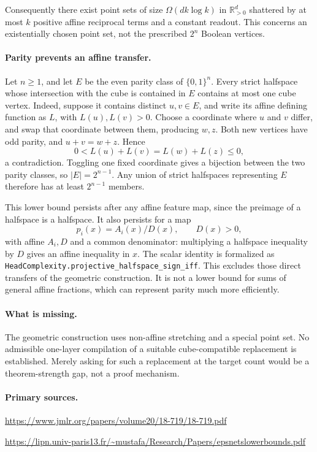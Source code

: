 \documentclass[11pt]{article}
\begin{document}
Consequently there exist point sets of size $\Omega(dk\log k)$ in
$\mathbb R_{>0}^d$ shattered by at most $k$ positive affine reciprocal
terms and a constant readout. This concerns an existentially chosen
point set, not the prescribed $2^n$ Boolean vertices.

\paragraph{Parity prevents an affine transfer.}
Let $n\ge1$, and let $E$ be the even parity class of $\{0,1\}^n$.
Every strict halfspace whose intersection with the cube is contained
in $E$ contains at most one cube vertex. Indeed, suppose it contains
distinct $u,v\in E$, and write its affine defining function as $L$,
with $L(u),L(v)>0$. Choose a coordinate where $u$ and $v$ differ,
and swap that coordinate between them, producing $w,z$.
Both new vertices have odd parity, and $u+v=w+z$. Hence
\[
 0<L(u)+L(v)=L(w)+L(z)\le0,
\]
a contradiction. Toggling one fixed coordinate gives a bijection
between the two parity classes, so $|E|=2^{n-1}$.
Any union of strict halfspaces representing $E$ therefore has at
least $2^{n-1}$ members.

This lower bound persists after any affine feature map, since the
preimage of a halfspace is a halfspace. It also persists for a map
\[
 p_i(x)=A_i(x)/D(x),\qquad D(x)>0,
\]
with affine $A_i,D$ and a common denominator: multiplying a halfspace
inequality by $D$ gives an affine inequality in $x$. The scalar
identity is formalized as
\texttt{HeadComplexity.projective\_halfspace\_sign\_iff}.
This excludes those direct transfers of the geometric construction.
It is not a lower bound for sums of general affine fractions, which
can represent parity much more efficiently.

\paragraph{What is missing.}
The geometric construction uses non-affine stretching and a special
point set. No admissible one-layer compilation of a suitable
cube-compatible replacement is established. Merely asking for such
a replacement at the target count would be a theorem-strength gap,
not a proof mechanism.

\paragraph{Primary sources.}
\url{https://www.jmlr.org/papers/volume20/18-719/18-719.pdf}

\url{https://lipn.univ-paris13.fr/~mustafa/Research/Papers/epsnetslowerbounds.pdf}
\end{document}
